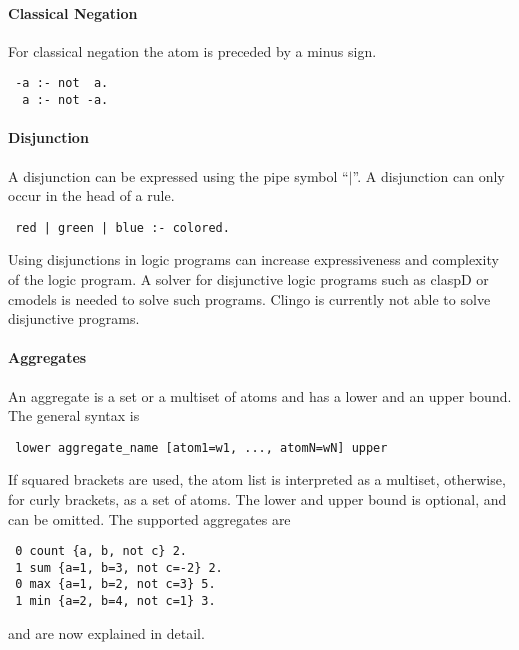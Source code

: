 \documentclass[a4paper,10pt]{article}
\begin{document}
\paragraph{Classical Negation}
For classical negation the atom is preceded by a minus sign.
\begin{verbatim}
 -a :- not  a.
  a :- not -a. 
\end{verbatim}
\paragraph{Disjunction}
A disjunction can be expressed using the pipe symbol ``$\mid$''.
A disjunction can only occur in the head of a rule.
\begin{verbatim}
 red | green | blue :- colored.
\end{verbatim}
Using disjunctions in logic programs can increase expressiveness and complexity of the logic program.
A solver for disjunctive logic programs such as claspD \cite{claspD} or cmodels \cite{cmodels} is needed to solve such programs. Clingo is currently not able to solve disjunctive programs.

\paragraph{Aggregates}
An aggregate is a set or a multiset of atoms and has a lower and an upper bound.
The general syntax is
\begin{verbatim}
 lower aggregate_name [atom1=w1, ..., atomN=wN] upper
\end{verbatim}
If squared brackets are used, the atom list is interpreted as a multiset, otherwise, for curly brackets, as a set of atoms.
The lower and upper bound is optional, and can be omitted. The supported aggregates are
\begin{verbatim}
 0 count {a, b, not c} 2.
 1 sum {a=1, b=3, not c=-2} 2.
 0 max {a=1, b=2, not c=3} 5.
 1 min {a=2, b=4, not c=1} 3.
\end{verbatim}
and are now explained in detail.
\end{document}
